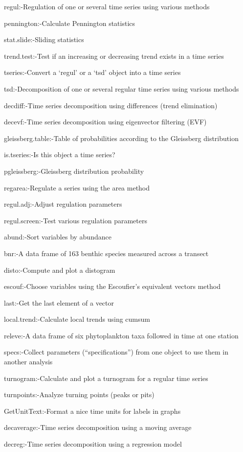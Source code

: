\documentclass[12pt,openany]{book}
\begin{document}
regul:-Regulation of one or several time series using various methods

pennington:-Calculate Pennington statistics

stat.slide:-Sliding statistics

trend.test:-Test if an increasing or decreasing trend exists in a time series

tseries:-Convert a `regul' or a `tsd' object into a time series

tsd:-Decomposition of one or several regular time series using various methods

decdiff:-Time series decomposition using differences (trend elimination)

decevf:-Time series decomposition using eigenvector filtering (EVF)

gleissberg.table:-Table of probabilities according to the Gleissberg distribution

is.tseries:-Is this object a time series?

pgleissberg:-Gleissberg distribution probability

regarea:-Regulate a series using the area method

regul.adj:-Adjust regulation parameters

regul.screen:-Test various regulation parameters

abund:-Sort variables by abundance

bnr:-A data frame of 163 benthic species measured across a transect

disto:-Compute and plot a distogram

escouf:-Choose variables using the Escoufier's equivalent vectors method

last:-Get the last element of a vector

local.trend:-Calculate local trends using cumsum

releve:-A data frame of six phytoplankton taxa followed in time at one station

specs:-Collect parameters (``specifications'') from one object to use them in another analysis

turnogram:-Calculate and plot a turnogram for a regular time series

turnpoints:-Analyze turning points (peaks or pits)

GetUnitText:-Format a nice time units for labels in graphs

decaverage:-Time series decomposition using a moving average

decreg:-Time series decomposition using a regression model
\end{document}
